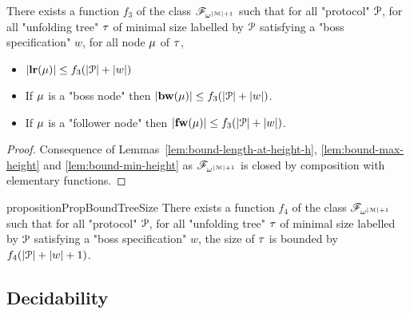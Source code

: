 \begin{corollary}
	\label{cor:bound-node-size}
	There exists a function $f_3$ of the class $\mathscr{F}_{\omega^{|\mathcal{M}|+1}}$ such that for all "protocol" $\mathcal{P}$, for all "unfolding tree" $\tau$ of minimal size labelled by $\mathcal{P}$ satisfying a "boss specification" $w$, for all node $\mu$ of $\tau$,
	
		\begin{itemize}
		\item $|\mathbf{lr}(\mu)| \leq f_3(|\mathcal{P}|+ |w|)$
			
		\item If $\mu$ is a "boss node" then $|\mathbf{bw}(\mu)| \leq f_3(|\mathcal{P}|+ |w|)$.
		
		\item If $\mu$ is a "follower node" then $|\mathbf{fw}(\mu)| \leq f_3(|\mathcal{P}|+ |w|)$.
	\end{itemize} 
\end{corollary}

\ifproofs
\begin{proof}
	Consequence of Lemmas~\ref{lem:bound-length-at-height-h}, \ref{lem:bound-max-height} and \ref{lem:bound-min-height} as $\mathscr{F}_{\omega^{|\mathcal{M}|+1}}$ is closed by composition with elementary functions.
\end{proof}
\fi
\begin{restatable}{proposition}{PropBoundTreeSize}
	\label{prop:bound-tree-size}
	There exists a function $f_4$ of the class $\mathscr{F}_{\omega^{|\mathcal{M}|+1}}$ such that for all "protocol" $\mathcal{P}$, for all "unfolding tree" $\tau$ of minimal size labelled by $\mathcal{P}$ satisfying a "boss specification" $w$, the size of $\tau$ is bounded by $f_4(|\mathcal{P}| + |w|+1)$.
\end{restatable}




\subsection{Decidability}
\label{sec:decidability-end}

\decidablecover*

